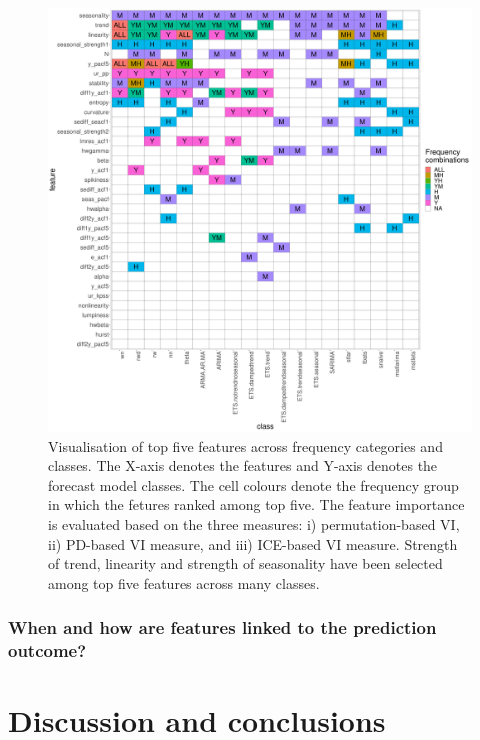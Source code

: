 \documentclass[11pt,a4paper,]{article}
\begin{document}
\begin{figure}[h]

{\centering \includegraphics[width=\textwidth]{figure/viplot-1} 

}

\caption{Visualisation  of top five features across frequency categories and classes. The X-axis denotes the features and Y-axis denotes the forecast model classes. The cell colours denote the frequency group in which the fetures ranked among top five. The feature importance is evaluated based on the three measures: i) permutation-based VI, ii) PD-based VI measure, and iii) ICE-based VI measure. Strength of trend, linearity and strength of seasonality have been selected among top five features across many classes.}\label{fig:viplot}
\end{figure}

\hypertarget{when-and-how-are-features-linked-to-the-prediction-outcome}{%
\subsubsection{When and how are features linked to the prediction outcome?}\label{when-and-how-are-features-linked-to-the-prediction-outcome}}

\hypertarget{discussion}{%
\section{Discussion and conclusions}\label{discussion}}
\end{document}
